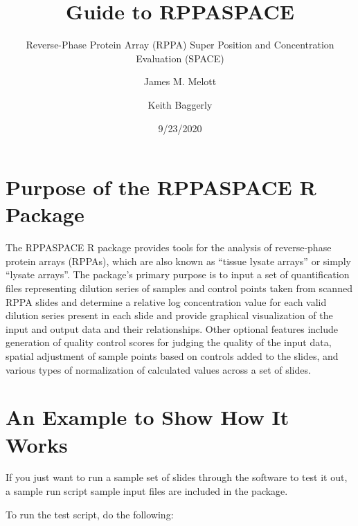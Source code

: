 \documentclass[
]{article}
\title{Guide to RPPASPACE}
\subtitle{Reverse-Phase Protein Array (RPPA) Super Position and Concentration
Evaluation (SPACE)}
\author{James M. Melott \and Keith Baggerly}
\date{9/23/2020}
\begin{document}
\maketitle

{
\hypersetup{linkcolor=}
\setcounter{tocdepth}{3}
\tableofcontents
}
\newpage

\hypertarget{intro}{%
\section{Purpose of the RPPASPACE R Package}\label{intro}}

The RPPASPACE R package provides tools for the analysis of reverse-phase
protein arrays (RPPAs), which are also known as ``tissue lysate arrays''
or simply ``lysate arrays''. The package's primary purpose is to input a
set of quantification files representing dilution series of samples and
control points taken from scanned RPPA slides and determine a relative
log concentration value for each valid dilution series present in each
slide and provide graphical visualization of the input and output data
and their relationships. Other optional features include generation of
quality control scores for judging the quality of the input data,
spatial adjustment of sample points based on controls added to the
slides, and various types of normalization of calculated values across a
set of slides.

\hypertarget{example}{%
\section{An Example to Show How It Works}\label{example}}

If you just want to run a sample set of slides through the software to
test it out, a sample run script sample input files are included in the
package.

To run the test script, do the following:
\end{document}

